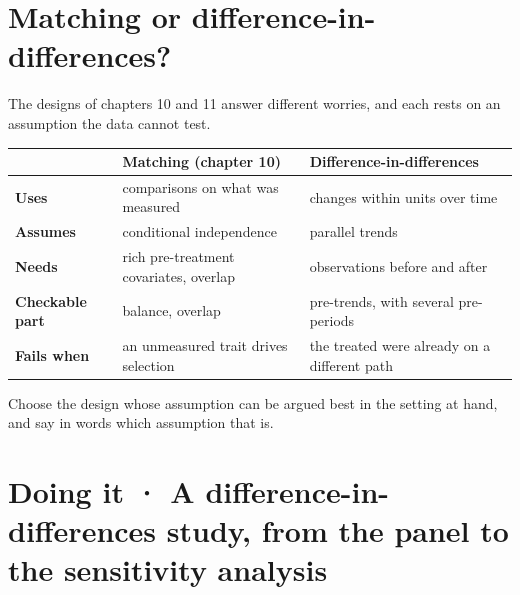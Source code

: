 \documentclass[
  letterpaper,
  10pt,
  twoside,
  openright,
  numbers=noenddot,
  chapterprefix=true]{scrbook}
\begin{document}
\section{Matching or
difference-in-differences?}\label{matching-or-difference-in-differences}

The designs of chapters 10 and 11 answer different worries, and each
rests on an assumption the data cannot test.

\begin{longtable}[]{@{}
  >{\raggedright\arraybackslash}p{}
  >{\raggedright\arraybackslash}p{}
  >{\raggedright\arraybackslash}p{}@{}}
\toprule\noalign{}
\begin{minipage}[b]{\linewidth}\raggedright
\end{minipage} & \begin{minipage}[b]{\linewidth}\raggedright
Matching (chapter 10)
\end{minipage} & \begin{minipage}[b]{\linewidth}\raggedright
Difference-in-differences
\end{minipage} \\
\midrule\noalign{}
\endhead
\bottomrule\noalign{}
\endlastfoot
\textbf{Uses} & comparisons on what was measured & changes within units
over time \\
\textbf{Assumes} & conditional independence & parallel trends \\
\textbf{Needs} & rich pre-treatment covariates, overlap & observations
before and after \\
\textbf{Checkable part} & balance, overlap & pre-trends, with several
pre-periods \\
\textbf{Fails when} & an unmeasured trait drives selection & the treated
were already on a different path \\
\end{longtable}

Choose the design whose assumption can be argued best in the setting at
hand, and say in words which assumption that is.

\section{Doing it · A difference-in-differences study, from the panel to
the sensitivity
analysis}\label{doing-it-a-difference-in-differences-study-from-the-panel-to-the-sensitivity-analysis}
\end{document}
